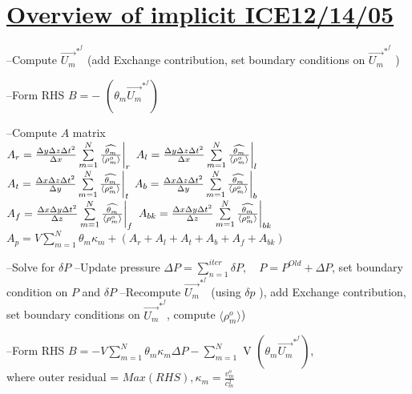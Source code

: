 \documentclass[fleqn]{article}
\newcommand{\SUM}[1]    {\ensuremath{\sum \limits_{{#1}=1}^N }}
\newcommand{\B}[1]      {\biggr{#1}}
\newcommand{\rhoM}      {\ensuremath{\rho^{o}_m}}
\newcommand{\rhoMFC}    {\ensuremath{\langle \rhoM \rangle}}
\newcommand{\delt}      {\ensuremath{\Delta{t}} }
\newcommand{\delx}      {\ensuremath{\Delta{x}} }
\newcommand{\dely}      {\ensuremath{\Delta{y}} }
\newcommand{\delz}      {\ensuremath{\Delta{z}} }
\newcommand{\velFC}     {\ensuremath{\vec{U_m}^{*^{f}} } }
\newcommand{\thetaUW}   {\ensuremath{\widehat{\theta_m}} }
\begin{document}
\setlength{\abovedisplayskip}{0.1in}
\setlength{\mathindent}{0.0in}

\section{\underline{Overview of implicit ICE\hspace{ 0.5in}12/14/05}  }

\begin{algorithmic}
\STATE --Compute $ \velFC$ (add Exchange contribution, set boundary
             conditions on $\velFC$ )
             
\STATE --Form RHS $B = -$ $(\theta_m \velFC)$
    

    \STATE --Compute $A$ matrix \\ \quad
      $A_r = \frac{\dely\delz\delt^2}{\delx} \SUM{m} \frac{\thetaUW}{\rhoMFC} \B{|}_{r}$ \quad
      $A_l = \frac{\dely\delz\delt^2}{\delx} \SUM{m} \frac{\thetaUW}{\rhoMFC} \B{|}_{l}$ \\ \quad
      $A_t = \frac{\delx\delz\delt^2}{\dely} \SUM{m} \frac{\thetaUW}{\rhoMFC} \B{|}_{t}$ \quad
      $A_b = \frac{\delx\delz\delt^2}{\dely} \SUM{m} \frac{\thetaUW}{\rhoMFC} \B{|}_{b}$ \\ \quad
      $A_f = \frac{\delx\dely\delt^2}{\delz} \SUM{m} \frac{\thetaUW}{\rhoMFC} \B{|}_{f}$ \quad
      $A_{bk} = \frac{\delx\dely\delt^2}{\delz} \SUM{m} \frac{\thetaUW}{\rhoMFC} \B{|}_{bk}$ \\ \quad
      $A_{p} =V\SUM{m} \theta_m \kappa_m +( A_r + A_l + A_t + A_b + A_f + A_ {bk})$
      
    \STATE --Solve for $\delta{P}$
    \STATE --Update pressure $\Delta{P} = \sum \limits_{n=1}^{iter} \delta{P}, \quad P = P^{Old} + \Delta{P}$, set boundary condition on $P$ and $\delta{P}$
    \STATE --Recompute $ \velFC$ (using $\delta {p}$ ), add Exchange contribution, set boundary
             conditions on $\velFC$, compute $ \rhoMFC $)
             
    \STATE --Form RHS $B = -V\SUM{m} \theta_m \kappa_m \Delta{P} - \SUM{m}$ V $(\theta_m \velFC)$,\\ \quad
             where outer residual = $Max(RHS), \kappa_m = \frac{v^o_m}{c_m^2}$
    
\ENDWHILE

\end{algorithmic}
\newpage
\end{document}
